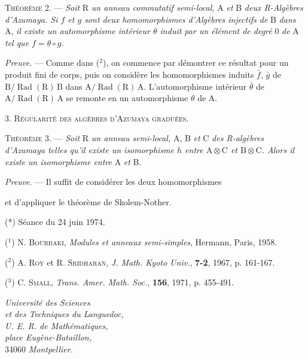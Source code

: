 \textsc{Théorème 2}. — \emph{Soit} R \emph{un anneau commutatif semi-local,} A \emph{et} B \emph{deux R-Algèbres d'Azumaya.
Si $f$ et $g$ sont deux homomorphismes d'Algèbres injectifs de} B \emph{dans} A, \emph{il existe un
automorphisme intérieur $\theta$ induit par un élément de degré} 0 \emph{de} A \emph{tel que $f=\theta\circ g$.}

\emph{Preuve}. — Comme dans (${}^2$), on commence par démontrer ce résultat pour un produit
fini de corps, puis on considère les homomorphismes induits $\bar f$, $\bar g$ de $\mathrm B/\operatorname{Rad}(\mathrm R)\,\mathrm B$ dans
$\mathrm A/\operatorname{Rad}(\mathrm R)\,\mathrm A$. L'automorphisme intérieur $\bar\theta$ de $\mathrm A/\operatorname{Rad}(\mathrm R)\,\mathrm A$ se remonte en un automorphisme
$\theta$ de A.

3. \textsc{Régularité des algèbres d'Azumaya graduées}.

\textsc{Théorème 3}. — \emph{Soit} R \emph{un anneau semi-local,} A, B \emph{et} C \emph{des R-algèbres d'Azumaya telles
qu'il existe un isomorphisme $h$ entre $\mathrm A\otimes\mathrm C$ et $\mathrm B\otimes\mathrm C$. Alors il existe un isomorphisme
entre} A \emph{et} B.

\emph{Preuve}. — Il suffit de considérer les deux homomorphismes


et d'appliquer le théorème de Skolem-Nother.

(*) Séance du 24 juin 1974.

(${}^1$) N. \textsc{Bourbaki}, \emph{Modules et anneaux semi-simples}, Hermann, Paris, 1958.

(${}^2$) A. \textsc{Roy} et R. \textsc{Sridharan}, \emph{J. Math. Kyoto Univ.}, \textbf{7-2}, 1967, p. 161-167.

(${}^3$) C. \textsc{Small}, \emph{Trans. Amer. Math. Soc.}, \textbf{156}, 1971, p. 455-491.

\begin{flushright}
\emph{Université des Sciences}\\
\emph{et des Techniques du Languedoc,}\\
\emph{U. E. R. de Mathématiques,}\\
\emph{place Eugène-Bataillon,}\\
34060 \emph{Montpellier.}
\end{flushright}

